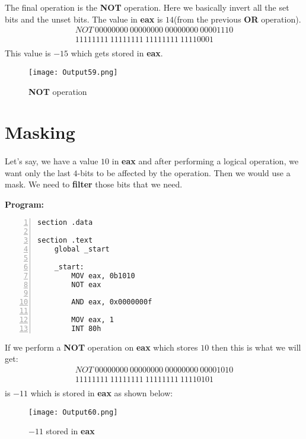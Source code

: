 \documentclass{article}
\begin{document}
The final operation is the \textbf{NOT} operation. Here we basically invert all the set bits and the unset bits. The value in \textbf{eax} is $14$(from the previous \textbf{OR} operation).
\begin{align*}
NOT\ 00000000\ 00000000\ 00000000\ 00001110 \\
\hline
11111111\ 11111111\ 11111111\ 11110001 \\
\end{align*}
This value is $-15$ which gets stored in \textbf{eax}.
\begin{figure}[h]
\centering
\texttt{[image: Output59.png]}
\caption{\textbf{NOT} operation}
\label{fig:fig3}
\end{figure}

\newpage
\section{Masking}\label{sec:sec2}
\paragraph{}
Let's say, we have a value $10$ in \textbf{eax} and after performing a logical operation, we want only the last $4$-bits to be affected by the operation. Then we would use a mask. We need to \textbf{filter} those bits that we need.

\textbf{Program:}
\begin{Verbatim}[numbers=left, frame=single]
section .data

section .text
	global _start
	
	_start:
		MOV eax, 0b1010
		NOT eax
		
		AND eax, 0x0000000f
		
		MOV eax, 1
		INT 80h
\end{Verbatim}

If we perform a \textbf{NOT} operation on \textbf{eax} which stores $10$ then this is what we will get:
\begin{align*}
NOT\ 00000000\ 00000000\ 00000000\ 00001010 \\
\hline
11111111\ 11111111\ 11111111\ 11110101 \\
\end{align*}
is $-11$ which is stored in \textbf{eax} as shown below:
\begin{figure}[h]
\centering
\texttt{[image: Output60.png]}
\caption{$-11$ stored in \textbf{eax}}
\label{fig:fig4}
\end{figure}
\end{document}
